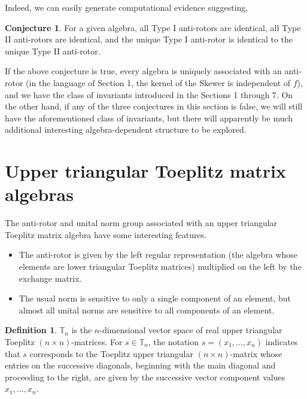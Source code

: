 \documentclass{amsart}
\theoremstyle{definition}
\newtheorem{definition}[theorem]{Definition}
\newtheorem{conjecture}[theorem]{Conjecture}
\numberwithin{theorem}{section}
\numberwithin{equation}{section}
\begin{document}
Indeed, we can easily generate computational evidence suggesting, 

\begin{conjecture}\label{10/28/25.1} For a given algebra, all Type I anti-rotors are identical, all Type II anti-rotors are identical, and the unique Type I anti-rotor is identical to the unique Type II anti-rotor. \end{conjecture}

If the above conjecture is true, every algebra is uniquely associated with an anti-rotor (in the language of Section 1, the kernel of the Skewer is independent of $f$), and we have the class of invariants introduced in the Sections 1 through 7.  On the other hand, if any of the three conjectures in this section is false, we will still have the aforementioned class of invariants, but there will apparently be much additional interesting algebra-dependent structure to be explored.
   
  

\vspace{.75cm}
 
 
 
\appendix

\section{Upper triangular Toeplitz matrix algebras} 

The anti-rotor and unital norm group associated with an upper triangular Toeplitz matrix algebra have some interesting features.
\begin{itemize}\item The anti-rotor is given by the left regular representation (the algebra whose elements are lower triangular Toeplitz matrices) multiplied on the left by the exchange matrix. \item The usual norm is sensitive to only a single component of an element, but almost all unital norms are sensitive to all components of an element.\end{itemize}


 \begin{definition}\label{5/4/22.1} $\mathbb{T}_n$ is the $n$-dimensional vector space of real upper triangular Toeplitz $(n\times n)$-matrices. For $s\in \mathbb{T}_n$, the notation $s=(x_1,\dots,x_n)$ indicates that $s$ corresponds to the Toeplitz upper triangular $(n\times n)$-matrix whose entries on the successive diagonals, beginning with the main diagonal and proceeding to the right, are given by the successive vector component values $x_1,\dots,x_n$.   
\end{definition}
\end{document}
